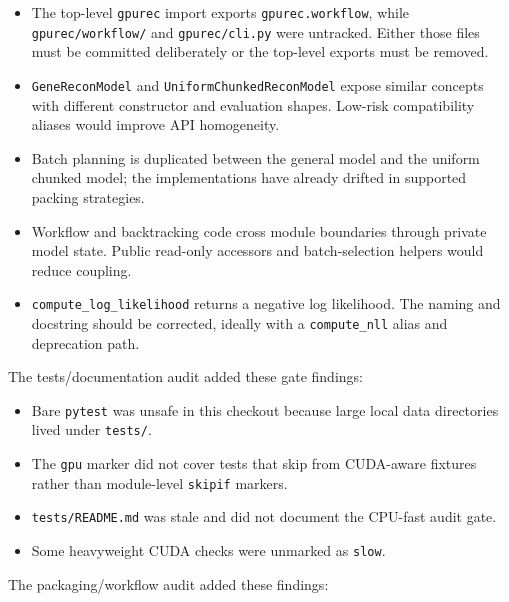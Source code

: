 \documentclass[11pt]{article}
\begin{document}
\begin{itemize}[leftmargin=*]
  \item The top-level \texttt{gpurec} import exports \texttt{gpurec.workflow},
        while \texttt{gpurec/workflow/} and \texttt{gpurec/cli.py} were
        untracked.  Either those files must be committed deliberately or the
        top-level exports must be removed.
  \item \texttt{GeneReconModel} and \texttt{UniformChunkedReconModel} expose
        similar concepts with different constructor and evaluation shapes.
        Low-risk compatibility aliases would improve API homogeneity.
  \item Batch planning is duplicated between the general model and the uniform
        chunked model; the implementations have already drifted in supported
        packing strategies.
  \item Workflow and backtracking code cross module boundaries through private
        model state.  Public read-only accessors and batch-selection helpers
        would reduce coupling.
  \item \texttt{compute\_log\_likelihood} returns a negative log likelihood.
        The naming and docstring should be corrected, ideally with a
        \texttt{compute\_nll} alias and deprecation path.
\end{itemize}

The tests/documentation audit added these gate findings:

\begin{itemize}[leftmargin=*]
  \item Bare \texttt{pytest} was unsafe in this checkout because large local
        data directories lived under \texttt{tests/}.
  \item The \texttt{gpu} marker did not cover tests that skip from CUDA-aware
        fixtures rather than module-level \texttt{skipif} markers.
  \item \texttt{tests/README.md} was stale and did not document the CPU-fast
        audit gate.
  \item Some heavyweight CUDA checks were unmarked as \texttt{slow}.
\end{itemize}

The packaging/workflow audit added these findings:
\end{document}
